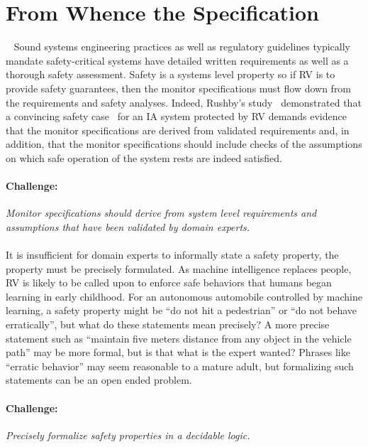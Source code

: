 \section{From Whence the Specification}~\label{sec:req} Sound systems
engineering practices as well as regulatory guidelines typically
mandate safety-critical systems have detailed written requirements as
well as a thorough safety assessment. Safety is a systems level
property so if RV is to provide safety guarantees, then the monitor
specifications must flow down from the requirements and safety
analyses.  Indeed, Rushby's study~\cite{rvRushby,RushbyAIAA09}
demonstrated that a convincing safety case~\cite{Kelly98arguingsafety}
for an IA system protected by RV demands evidence that the monitor
specifications are derived from validated requirements and, in
addition, that the monitor specifications should include checks of the
assumptions on which safe operation of the system rests are indeed
satisfied.

\paragraph{Challenge:} \emph{ Monitor specifications should derive from
  system level requirements and assumptions that have been validated
  by domain experts.} 


\paragraph{}It is insufficient for domain experts to informally state a safety
property, the property must be precisely formulated.  As machine
intelligence replaces people, RV is likely to be called upon to
enforce safe behaviors that humans began learning in early childhood.
For an autonomous automobile controlled by  machine learning, a
safety property might be ``do not hit a pedestrian'' or ``do not
behave erratically'', but what do these statements mean precisely?  A
more precise  statement such as ``maintain  five meters distance from any object
in the vehicle path'' may be more formal, but is that what is the
expert wanted?  Phrases like ``erratic behavior'' may seem reasonable 
to a mature adult, but formalizing such statements can be an open
ended problem.  

\paragraph{Challenge:} \emph{Precisely formalize safety properties  in
  a decidable logic.}

